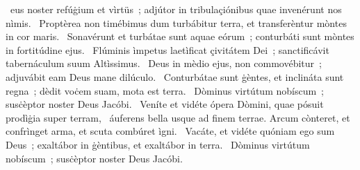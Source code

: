{ }
{%
~eus noster refúġium et vìrtüs~; adjútor in tribulaçiónibus quae invenérunt nos nìmis. 
~Proptèrea non timébimus dum turbábitur terra, et transferèntur mòntes in cor maris. 
~Sonavérunt et turbátae sunt aquae eórum~; conturbáti sunt mòntes in fortitúdine ejus. 
~Flúminis ìmpetus laetìficat çivitátem Dei~; sanctificávit tabernáculum suum Altìssimus. 
~Deus in mèdio ejus, non commovébitur~; adjuvábit eam Deus mane dilúculo. 
~Conturbátae sunt ġèntes, et inclináta sunt regna~; dèdit voċem suam, mota est terra. 
~Dòminus virtútum nobíscum~; susċèptor noster Deus Jacóbi. 
~Veníte et vidéte ópera Dòmini, quae pósuit prodìġia super terram, 
~áuferens bella usque ad finem terrae. Arcum cònteret, et confrìnget arma, et scuta combúret ìgni. 
~Vacáte, et vidéte quóniam ego sum Deus~; exaltábor in ġèntibus, et exaltábor in terra. 
~Dòminus virtútum nobíscum~; susċèptor noster Deus Jacóbi. 
}
